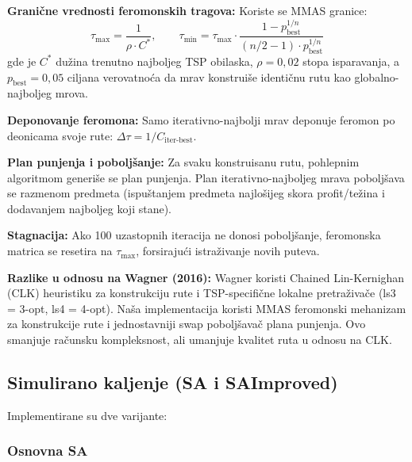 \documentclass[12pt,a4paper]{article}
\begin{document}
\textbf{Grani\v{c}ne vrednosti feromonskih tragova:} Koriste se MMAS granice:
\begin{equation}
    \tau_{\max} = \frac{1}{\rho \cdot C^*}, \qquad
    \tau_{\min} = \tau_{\max} \cdot \frac{1 - p_{\text{best}}^{1/n}}{(n/2 - 1) \cdot p_{\text{best}}^{1/n}}
\end{equation}
gde je $C^*$ du\v{z}ina trenutno najboljeg TSP obilaska, $\rho = 0{,}02$ stopa isparavanja, a $p_{\text{best}} = 0{,}05$ ciljana verovatno\'{c}a da mrav konstrui\v{s}e identičnu rutu kao globalno-najboljeg mrova.

\textbf{Deponovanje feromona:} Samo iterativno-najbolji mrav deponuje feromon po deonicama svoje rute: $\Delta\tau = 1 / C_{\text{iter-best}}$.

\textbf{Plan punjenja i pobolj\v{s}anje:} Za svaku konstruisanu rutu, pohlepnim algoritmom generi\v{s}e se plan punjenja. Plan iterativno-najboljeg mrava pobolj\v{s}ava se razmenom predmeta (ispuštanjem predmeta najlo\v{s}ijeg skora profit/te\v{z}ina i dodavanjem najboljeg koji stane).

\textbf{Stagnacija:} Ako 100 uzastopnih iteracija ne donosi pobolj\v{s}anje, feromonska matrica se resetira na $\tau_{\max}$, forsiraju\'{c}i istra\v{z}ivanje novih puteva.

\textbf{Razlike u odnosu na Wagner (2016):} Wagner koristi Chained Lin-Kernighan (CLK) heuristiku za konstrukciju rute i TSP-specifi\v{c}ne lokalne pretra\v{z}iva\v{c}e (ls3 = 3-opt, ls4 = 4-opt). Na\v{s}a implementacija koristi MMAS feromonski mehanizam za konstrukcije rute i jednostavniji swap pobolj\v{s}ava\v{c} plana punjenja. Ovo smanjuje ra\v{c}unsku kompleksnost, ali umanjuje kvalitet ruta u odnosu na CLK.

\subsection{Simulirano kaljenje (SA i SAImproved)}

Implementirane su dve varijante:

\subsubsection{Osnovna SA}
\end{document}
